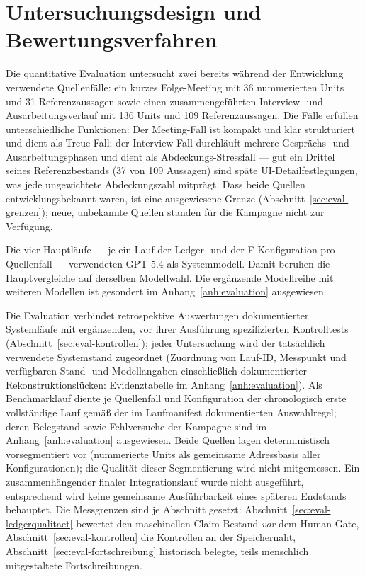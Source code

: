 \section{Untersuchungsdesign und Bewertungsverfahren}
\label{sec:eval-design}

Die quantitative Evaluation untersucht zwei bereits während der
Entwicklung verwendete Quellenfälle: ein kurzes Folge-Meeting mit
36 nummerierten Units und 31 Referenzaussagen sowie einen
zusammengeführten Interview- und Ausarbeitungsverlauf mit 136
Units und 109 Referenzaussagen. Die Fälle erfüllen
unterschiedliche Funktionen: Der Meeting-Fall ist kompakt und klar
strukturiert und dient als Treue-Fall; der Interview-Fall
durchläuft mehrere Gesprächs- und Ausarbeitungsphasen und dient
als Abdeckungs-Stressfall --- gut ein Drittel seines
Referenzbestands (37 von 109 Aussagen) sind späte
UI-Detailfestlegungen, was jede ungewichtete Abdeckungszahl
mitprägt. Dass beide Quellen entwicklungsbekannt waren, ist eine
ausgewiesene Grenze (Abschnitt~\ref{sec:eval-grenzen}); neue, unbekannte Quellen
standen für die Kampagne nicht zur Verfügung.

Die vier Hauptläufe --- je ein Lauf der Ledger- und der
F-Konfiguration pro Quellenfall --- verwendeten GPT-5.4 als
Systemmodell. Damit beruhen die Hauptvergleiche auf derselben
Modellwahl. Die ergänzende Modellreihe mit weiteren Modellen ist
gesondert im Anhang~\ref{anh:evaluation} ausgewiesen.

Die Evaluation verbindet retrospektive Auswertungen
dokumentierter Systemläufe mit ergänzenden, vor ihrer Ausführung
spezifizierten Kontrolltests (Abschnitt~\ref{sec:eval-kontrollen}); jeder Untersuchung
wird der tatsächlich verwendete Systemstand zugeordnet
(Zuordnung von Lauf-ID, Messpunkt und verfügbaren Stand- und
Modellangaben einschließlich dokumentierter Rekonstruktionslücken:
Evidenztabelle im Anhang~\ref{anh:evaluation}). Als
Benchmarklauf diente je Quellenfall und Konfiguration der
chronologisch erste vollständige Lauf gemäß der im Laufmanifest
dokumentierten Auswahlregel; deren Belegstand sowie Fehlversuche
der Kampagne sind im
Anhang~\ref{anh:evaluation} ausgewiesen. Beide Quellen lagen deterministisch vorsegmentiert
vor (nummerierte Units als gemeinsame Adressbasis aller
Konfigurationen); die Qualität dieser Segmentierung wird nicht
mitgemessen. Ein zusammenhängender finaler Integrationslauf wurde
nicht ausgeführt, entsprechend wird keine gemeinsame
Ausführbarkeit eines späteren Endstands behauptet. Die
Messgrenzen sind je Abschnitt gesetzt: Abschnitt~\ref{sec:eval-ledgerqualitaet} bewertet den
maschinellen Claim-Bestand \emph{vor} dem Human-Gate,
Abschnitt~\ref{sec:eval-kontrollen} die Kontrollen an der Speichernaht, Abschnitt~\ref{sec:eval-fortschreibung}
historisch belegte, teils menschlich mitgestaltete
Fortschreibungen.

